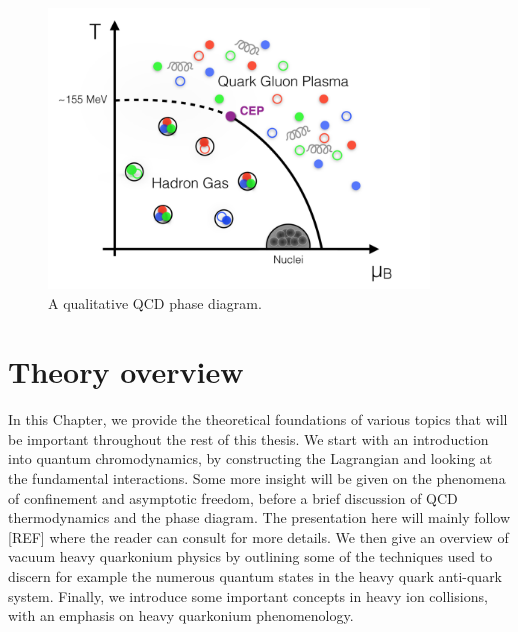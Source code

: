 \documentclass[12pt, a4paper, twoside]{book}
\begin{document}
\begin{figure}
	\centering
	\includegraphics[width=0.9\textwidth]{QCDphase}
	\caption{A qualitative QCD phase diagram.}\label{fig:QCDphasediag}
\end{figure}

\chapter{Theory overview}
\label{sec:theory_ov}
\onehalfspacing
In this Chapter, we provide the theoretical foundations of various topics that will be important throughout the rest of this thesis. We start with an introduction into quantum chromodynamics, by constructing the Lagrangian and looking at the fundamental interactions. Some more insight will be given on the phenomena of confinement and asymptotic freedom, before a brief discussion of QCD thermodynamics and the phase diagram. The presentation here will mainly follow [REF] where the reader can consult for more details. We then give an overview of vacuum heavy quarkonium physics by outlining some of the techniques used to discern for example the numerous quantum states in the heavy quark anti-quark system. Finally, we introduce some important concepts in heavy ion collisions, with an emphasis on heavy quarkonium phenomenology. 
\end{document}
